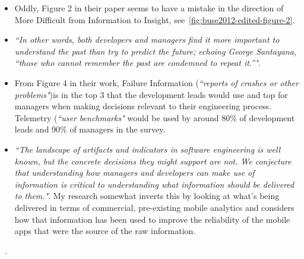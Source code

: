 \begin{itemize}
\begin{itemize}
        \item Oddly, Figure 2 in their paper seems to have a mistake in the direction of More Difficult from Information to Insight, see~\ref{fig:buse2012-edited-figure-2}.
        
        \item \emph{``In other words, both developers and managers find it more important to understand the past than try to predict the future; echoing George Santayana, “those who cannot remember the past are condemned to repeat it.”"}.
        
        \item From Figure 4 in their work, Failure Information (\emph{``reports of crashes or other problems"})is in the top 3 that the development leads would use and top for managers when making decisions relevant to their engineering process. Telemetry (\emph{``user benchmarks"} would be used by around 80\% of development leads and 90\% of managers in the survey.
        
        \item \emph{``The landscape of artifacts and indicators in software engineering is well known, but the concrete decisions they might support are not. We conjecture that understanding how managers and developers can make use of information is critical to understanding what information should be delivered to them."}. My research somewhat inverts this by looking at what's being delivered in terms of commercial, pre-existing mobile analytics and considers how that information has been used to improve the reliability of the mobile apps that were the source of the raw information.
        
    \end{itemize}~\citep{buse2012_information_needs_for_software_development_analytics}.
    

\end{itemize}
